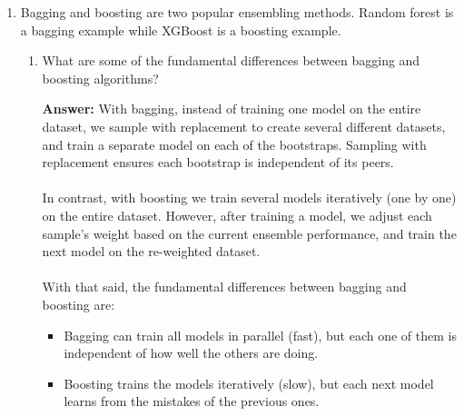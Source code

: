 \documentclass{article}
\newenvironment{QandA}{\begin{enumerate}[label=\arabic*.]}{\end{enumerate}}
\newenvironment{InnerQandA}{\begin{enumerate}[label=\roman*.]}{\end{enumerate}}
\newenvironment{answer}{\par\normalfont \textbf{Answer:}}{}
\begin{document}
\begin{QandA}
\begin{InnerQandA}
\begin{answer}
            (Source: \href{https://www.youtube.com/watch?v=4FG0TWJRRPI&ab_channel=CarletonAISociety}{CAIS})
        \end{answer}

        \item When would you choose one over another?
        \begin{answer}
            In general case, it would be advisable to default to using GMMs, since they generalize better to various cluster shapes. However, given some prior knowledge that the clusters are supposed to have spherical shapes, it might be beneficial to use K-Means as it explicitly encodes this property.
        \end{answer}
    \end{InnerQandA}

    \item Bagging and boosting are two popular ensembling methods. Random forest is a bagging example while XGBoost is a boosting example.
    \begin{InnerQandA}
        \item What are some of the fundamental differences between bagging and boosting algorithms?
        \begin{answer}
            With bagging, instead of training one model on the entire dataset, we sample with replacement to create several different datasets, and train a separate model on each of the bootstraps. Sampling with replacement ensures each bootstrap is independent of its peers. \\\\
            In contrast, with boosting we train several models iteratively (one by one) on the entire dataset. However, after training a model, we adjust each sample's weight based on the current ensemble performance, and train the next model on the re-weighted dataset.\\\\
            With that said, the fundamental differences between bagging and boosting are:
            \begin{itemize}
                \item Bagging can train all models in parallel (fast), but each one of them is independent of how well the others are doing. 
                \item Boosting trains the models iteratively (slow), but each next model learns from the mistakes of the previous ones.
            \end{itemize}
        \end{answer}


\end{InnerQandA}
\end{QandA}
\end{document}
